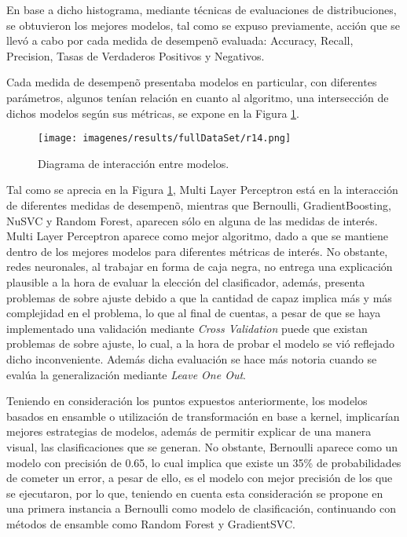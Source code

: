En base a dicho histograma, mediante t\'ecnicas de evaluaciones de distribuciones, se obtuvieron los mejores modelos, tal como se expuso previamente, acci\'on que se llev\'o a cabo por cada medida de desempen\~o evaluada: Accuracy, Recall, Precision, Tasas de Verdaderos Positivos y Negativos. 


Cada medida de desempen\~o presentaba modelos en particular, con diferentes par\'ametros, algunos ten\'ian relaci\'on en cuanto al algoritmo, una intersecci\'on de dichos modelos seg\'un sus m\'etricas, se expone en la Figura \ref{dis1}.

\begin{figure}[!h]
	\centering
	\texttt{[image: imagenes/results/fullDataSet/r14.png]}
	\caption{Diagrama de interacci\'on entre modelos.}
	\label{dis1}
\end{figure}

Tal como se aprecia en la Figura \ref{dis1}, Multi Layer Perceptron est\'a en la interacci\'on de diferentes medidas de desempen\~o, mientras que Bernoulli, GradientBoosting, NuSVC y Random Forest, aparecen s\'olo en alguna de las medidas de inter\'es. Multi Layer Perceptron aparece como mejor algoritmo, dado a que se mantiene dentro de los mejores modelos para diferentes m\'etricas de inter\'es. No obstante, redes neuronales, al trabajar en forma de caja negra, no entrega una explicaci\'on plausible a la hora de evaluar la elecci\'on del clasificador, adem\'as, presenta problemas de sobre ajuste debido a que la cantidad de capaz implica m\'as y  m\'as complejidad en el problema, lo que al final de cuentas, a pesar de que se haya implementado una validaci\'on mediante \textit{Cross Validation} puede que existan problemas de sobre ajuste, lo cual, a la hora de probar el modelo se vi\'o reflejado dicho inconveniente. Adem\'as dicha evaluaci\'on se hace m\'as notoria cuando se eval\'ua la generalizaci\'on mediante \textit{Leave One Out}.

Teniendo en consideraci\'on los puntos expuestos anteriormente, los modelos basados en ensamble o utilizaci\'on de transformaci\'on en base a kernel, implicar\'ian mejores estrategias de modelos, adem\'as de permitir explicar de una manera visual, las clasificaciones que se generan. No obstante, Bernoulli aparece como un modelo con precisi\'on de 0.65, lo cual implica que existe un 35\% de probabilidades de cometer un error, a pesar de ello, es el modelo con mejor precisi\'on de los que se ejecutaron, por lo que, teniendo en cuenta esta consideraci\'on se propone en una primera instancia a Bernoulli como modelo de clasificaci\'on, continuando con m\'etodos de ensamble como Random Forest y GradientSVC.


